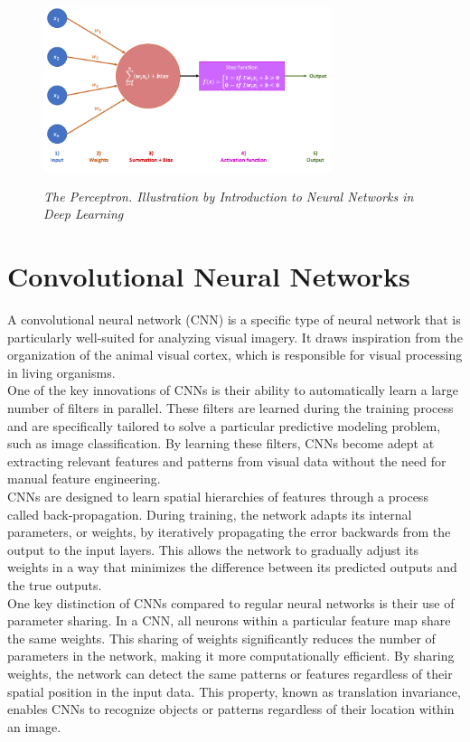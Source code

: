 \begin{figure}[H]
\centering
\includegraphics[width=0.75\textwidth]{imatges/preliminaries/perceptron.png}
\caption[The Perceptron]{\textit{The Perceptron. Illustration by Introduction to Neural Networks in Deep Learning}}
{\label{fig:perceptron}}
\end{figure}


\section{Convolutional Neural Networks}

A convolutional neural network (CNN) is a specific type of neural network that is particularly well-suited for analyzing visual imagery. It draws inspiration from the organization of the animal visual cortex, which is responsible for visual processing in living organisms. \\

One of the key innovations of CNNs is their ability to automatically learn a large number of filters in parallel. These filters are learned during the training process and are specifically tailored to solve a particular predictive modeling problem, such as image classification. By learning these filters, CNNs become adept at extracting relevant features and patterns from visual data without the need for manual feature engineering. \\

CNNs are designed to learn spatial hierarchies of features through a process called back-propagation. During training, the network adapts its internal parameters, or weights, by iteratively propagating the error backwards from the output to the input layers. This allows the network to gradually adjust its weights in a way that minimizes the difference between its predicted outputs and the true outputs. \\

One key distinction of CNNs compared to regular neural networks is their use of parameter sharing. In a CNN, all neurons within a particular feature map share the same weights. This sharing of weights significantly reduces the number of parameters in the network, making it more computationally efficient. By sharing weights, the network can detect the same patterns or features regardless of their spatial position in the input data. This property, known as translation invariance, enables CNNs to recognize objects or patterns regardless of their location within an image.\\

